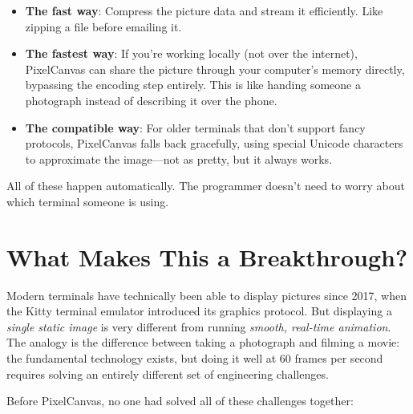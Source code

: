 \documentclass[12pt, a4paper]{article}
\begin{document}
\begin{itemize}[leftmargin=1.5em, itemsep=0.5em]
    \item \textbf{The fast way}: Compress the picture data and stream it efficiently. Like zipping a file before emailing it.
    \item \textbf{The fastest way}: If you're working locally (not over the internet), PixelCanvas can share the picture through your computer's memory directly, bypassing the encoding step entirely. This is like handing someone a photograph instead of describing it over the phone.
    \item \textbf{The compatible way}: For older terminals that don't support fancy protocols, PixelCanvas falls back gracefully, using special Unicode characters to approximate the image---not as pretty, but it always works.
\end{itemize}

All of these happen automatically. The programmer doesn't need to worry about which terminal someone is using.

\section{What Makes This a Breakthrough?}

Modern terminals have technically been able to display pictures since 2017, when the Kitty terminal emulator introduced its graphics protocol. But displaying a \emph{single static image} is very different from running \emph{smooth, real-time animation}. The analogy is the difference between taking a photograph and filming a movie: the fundamental technology exists, but doing it well at 60 frames per second requires solving an entirely different set of engineering challenges.

Before PixelCanvas, no one had solved all of these challenges together:
\end{document}
